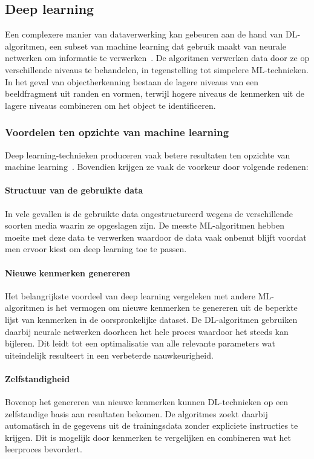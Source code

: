 \subsection{Deep learning}
\label{subsec:deep-learning-algoritmen}
Een complexere manier van dataverwerking kan gebeuren aan de hand van DL-algoritmen, een subset van machine learning dat gebruik maakt van neurale netwerken om informatie te verwerken~\autocite{Bozic2024}.
De algoritmen verwerken data door ze op verschillende niveaus te behandelen, in tegenstelling tot simpelere ML-technieken.
In het geval van objectherkenning bestaan de lagere niveaus van een beeldfragment uit randen en vormen, terwijl hogere niveaus de kenmerken uit de lagere niveaus combineren om het object te identificeren.

\subsubsection{Voordelen ten opzichte van machine learning}
Deep learning-technieken produceren vaak betere resultaten ten opzichte van machine learning~\autocite{Ahmed2023}.
Bovendien krijgen ze vaak de voorkeur door volgende redenen:

\paragraph{Structuur van de gebruikte data}
In vele gevallen is de gebruikte data ongestructureerd wegens de verschillende soorten media waarin ze opgeslagen zijn.
De meeste ML-algoritmen hebben moeite met deze data te verwerken waardoor de data vaak onbenut blijft voordat men ervoor kiest om deep learning toe te passen.

\paragraph{Nieuwe kenmerken genereren}
Het belangrijkste voordeel van deep learning vergeleken met andere ML-algoritmen is het vermogen om nieuwe kenmerken te genereren uit de beperkte lijst van kenmerken in de oorspronkelijke dataset.
De DL-algoritmen gebruiken daarbij neurale netwerken doorheen het hele proces waardoor het steeds kan bijleren.
Dit leidt tot een optimalisatie van alle relevante parameters wat uiteindelijk resulteert in een verbeterde nauwkeurigheid.

\paragraph{Zelfstandigheid}
Bovenop het genereren van nieuwe kenmerken kunnen DL-technieken op een zelfstandige basis aan resultaten bekomen.
De algoritmes zoekt daarbij automatisch in de gegevens uit de trainingsdata zonder expliciete instructies te krijgen.
Dit is mogelijk door kenmerken te vergelijken en combineren wat het leerproces bevordert.

